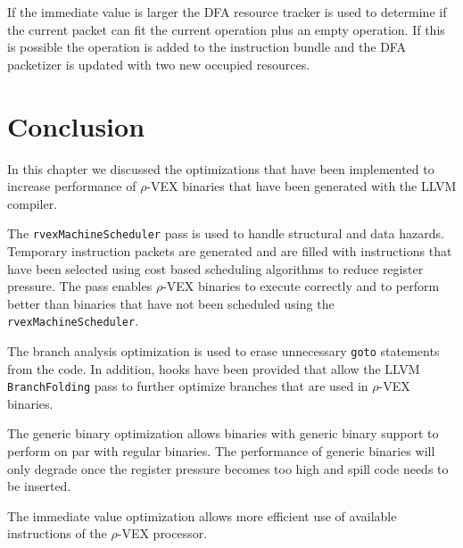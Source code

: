 If the immediate value is larger the DFA resource tracker is used to determine if the current packet can fit the current operation plus an empty operation. If this is possible the operation is added to the instruction bundle and the DFA packetizer is updated with two new occupied resources.




\section{Conclusion}
In this chapter we discussed the optimizations that have been implemented to increase performance of $\rho$-VEX binaries that have been generated with the LLVM compiler.

The \texttt{rvexMachineScheduler} pass is used to handle structural and data hazards. Temporary instruction packets are generated and are filled with instructions that have been selected using cost based scheduling algorithms to reduce register pressure. The pass enables $\rho$-VEX binaries to execute correctly and to perform better than binaries that have not been scheduled using the \texttt{rvexMachineScheduler}.

The branch analysis optimization is used to erase unnecessary \texttt{goto} statements from the code. In addition, hooks have been provided that allow the LLVM \texttt{BranchFolding} pass to further optimize branches that are used in $\rho$-VEX binaries.

The generic binary optimization allows binaries with generic binary support to perform on par with regular binaries. The performance of generic binaries will only degrade once the register pressure becomes too high and spill code needs to be inserted.

The immediate value optimization allows more efficient use of available instructions of the  $\rho$-VEX processor.
\acresetall


